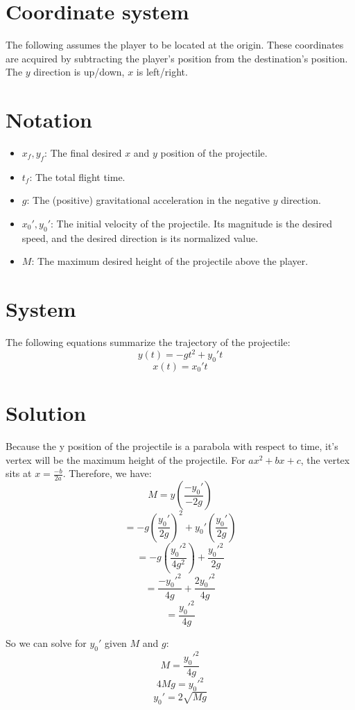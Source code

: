 \documentclass[12pt]{article}
\begin{document}
\section*{Coordinate system}
The following assumes the player to be located at the origin. These coordinates are acquired by subtracting the player's position from the destination's position. The $y$ direction is up/down, $x$ is left/right.

\section*{Notation}
\begin{itemize}
    \item $x_f, y_f$: The final desired $x$ and $y$ position of the projectile.
    \item $t_f$: The total flight time.
    \item $g$: The (positive) gravitational acceleration in the negative $y$ direction.
    \item $x_0', y_0'$: The initial velocity of the projectile. Its magnitude is the desired speed, and the desired direction is its normalized value.
    \item $M$: The maximum desired height of the projectile above the player.
\end{itemize}

\section*{System}
The following equations summarize the trajectory of the projectile:
\[ y(t) = -gt^2 + y_0't \]
\[ x(t) = x_0't \]

\section*{Solution}
Because the y position of the projectile is a parabola with respect to time, it's vertex will be the maximum height of the projectile. For $ax^2 + bx + c$, the vertex sits at $x = \frac{-b}{2a}$. Therefore, we have:
\[ M = y \left( \frac{-y_0'}{-2g} \right) \]
\[ = -g\left( \frac{y_0'}{2g} \right)^2 + y_0'\left( \frac{y_0'}{2g} \right) \]
\[ = -g\left( \frac{y_0'^2}{4g^2} \right) + \frac{y_0'^2}{2g} \]
\[ = \frac{-y_0'^2}{4g} + \frac{2y_0'^2}{4g} \]
\[ = \frac{y_0'^2}{4g} \]

So we can solve for $y_0'$ given $M$ and $g$:
\[ M = \frac{y_0'^2}{4g} \]
\[ 4Mg = y_0'^2 \]
\[ y_0' = 2\sqrt{Mg} \]
\end{document}

